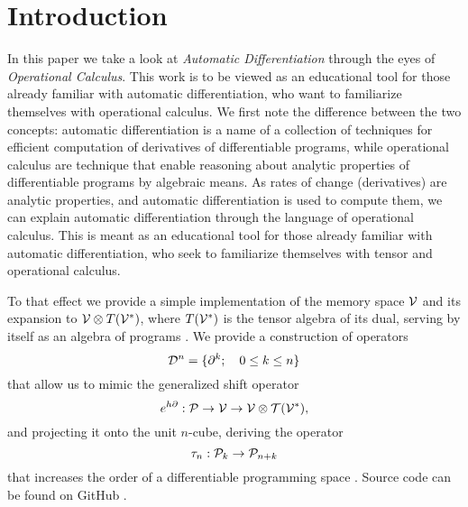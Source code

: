 \section{Introduction}\label{sec:introduction}

In this paper we take a look at \emph{Automatic Differentiation} through the eyes of \emph{Operational Calculus}. This work is to be viewed as an educational tool for those already familiar with automatic differentiation, who want to familiarize themselves with operational calculus. We first note the difference between the two concepts: automatic differentiation is a name of a collection of techniques for efficient computation of derivatives of differentiable programs, while operational calculus are technique that enable reasoning about analytic properties of differentiable programs by algebraic means. As rates of change (derivatives) are analytic properties, and automatic differentiation is used to compute them, we can explain automatic differentiation through the language of operational calculus. This is meant as an educational tool for those already familiar with automatic differentiation, who seek to familiarize themselves with tensor and operational calculus.

To that effect we provide a simple implementation of the memory space $\mathcal{V}$ and its expansion to $\mathcal{V}\otimes T(\mathcal{V}^*)$, where $T(\mathcal{V}^*)$ is the tensor algebra of its dual, serving by itself as an algebra of programs \cite[Definition~4.1]{OperationalCalculus}.
We provide a construction of operators
\begin{equation}
\mathcal{D}^n=\{\partial^k;\quad 0\le k\le n\}
\end{equation}
that allow us to mimic the generalized shift operator \cite[Theorem~5.2]{OperationalCalculus}
 \begin{equation}
                  	e^{h\partial}:\mathcal{P}\to \mathcal{V}\to \mathcal{V}\otimes \mathcal{T}(\mathcal{V}^*),
         \end{equation}
and projecting it onto the unit $n$-cube, deriving the operator 
\begin{equation}\label{eq:sumd}
\tau_n:\mathcal{P}_k\to\mathcal{P}_{n+k}
\end{equation} 
that increases the order of a differentiable programming space \cite[Proposition~5.1]{OperationalCalculus}.
Source code can be found on GitHub \cite{dCpp}.

